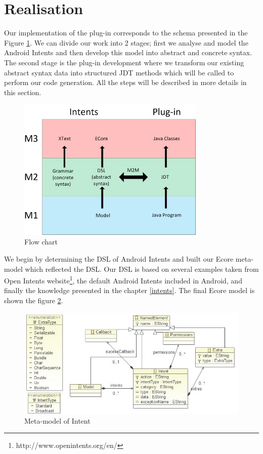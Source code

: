 \section{Realisation}
\label{realisation}

Our implementation of the plug-in corresponds to the schema presented in the Figure \ref{flowchart}. We can divide our work into 2 stages; first we analyse and model the Android Intents and then develop this model into abstract and concrete syntax. The second stage is the plug-in development where we transform our existing abstract syntax data into structured JDT methods which will be called to perform our code generation. All the steps will be described in more details in this section.  

\begin{figure}[t]
\label{flowchart}
  \centering
    \includegraphics[width=0.8\textwidth]{flowchart}
  \caption{Flow chart}
\end{figure}

We begin by determining the DSL of Android Intents and built our Ecore meta-model which reflected the DSL. Our DSL is based on several examples taken from Open Intents website\footnote{http://www.openintents.org/en/}, the default Android Intents included in Android, and finally the knowledge presented in the chapter \ref{intents}. The final Ecore model is shown the figure \ref{meta-model}.

\begin{figure}[t]
\label{meta-model}
  \centering
    \includegraphics[width=\textwidth]{metamodel}
  \caption{Meta-model of Intent}
\end{figure}

